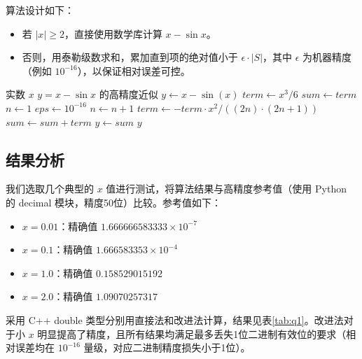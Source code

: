 \documentclass{article}
\begin{document}
算法设计如下：
\begin{itemize}
    \item 若 \(|x| \ge 2\)，直接使用数学库计算 \(x - \sin x\)。
    \item 否则，用泰勒级数求和，累加直到项的绝对值小于 \(\epsilon \cdot |S|\)，其中 \(\epsilon\) 为机器精度（例如 \(10^{-16}\)），以保证相对误差可控。
\end{itemize}

\begin{algorithm}[H]
\caption{计算 \(y = x - \sin x\)（保证最多丢失1位二进制有效位）}
\begin{algorithmic}[1]
\REQUIRE 实数 \(x\)
\ENSURE \(y = x - \sin x\) 的高精度近似
    \STATE \(y \gets x - \sin(x)\)
\ELSE
    \STATE \(term \gets x^3 / 6\)          
    \STATE \(sum \gets term\)
    \STATE \(n \gets 1\)                    
    \STATE \(eps \gets 10^{-16}\)           
        \STATE \(n \gets n + 1\)
        \STATE \(term \gets -term \cdot x^2 / ((2n) \cdot (2n+1))\) 
        \STATE \(sum \gets sum + term\)
    \ENDWHILE
    \STATE \(y \gets sum\)
\ENDIF
\RETURN \(y\)
\end{algorithmic}
\end{algorithm}

\subsection{结果分析}
我们选取几个典型的 \(x\) 值进行测试，将算法结果与高精度参考值（使用 Python 的 decimal 模块，精度50位）比较。参考值如下：
\begin{itemize}
    \item \(x=0.01\)：精确值 \(1.666666583333\times 10^{-7}\)
    \item \(x=0.1\)：精确值 \(1.666583353\times 10^{-4}\)
    \item \(x=1.0\)：精确值 \(0.158529015192\)
    \item \(x=2.0\)：精确值 \(1.09070257317\)
\end{itemize}
采用 C++ double 类型分别用直接法和改进法计算，结果见表\ref{tab:q1}。改进法对于小 \(x\) 明显提高了精度，且所有结果均满足最多丢失1位二进制有效位的要求（相对误差均在 \(10^{-16}\) 量级，对应二进制精度损失小于1位）。
\end{document}

